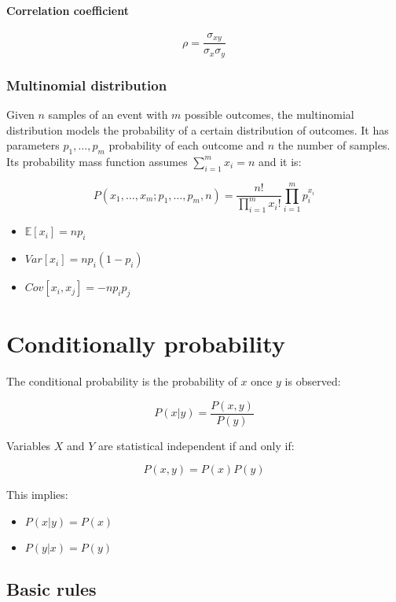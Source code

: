 			\paragraph{Correlation coefficient}

			$$\rho = \frac{\sigma_{xy}}{\sigma_x\sigma_y}$$

		\subsubsection{Multinomial distribution}
		Given $n$ samples of an event with $m$ possible outcomes, the multinomial distribution models the probability of a certain distribution of outcomes.
		It has parameters $p_1,\dots, p_m$ probability of each outcome and $n$ the number of samples.
		Its probability mass function assumes $\sum\limits_{i=1}^mx_i = n$ and it is:

		$$P(x_1, \dots, x_m; p_1, \dots, p_m, n) = \dfrac{n!}{\prod\limits_{i=1}^mx_i!}\prod\limits_{i=1}^mp_i^{x_i}$$

		\begin{multicols}{3}
			\begin{itemize}
				\item $\mathbb{E}[x_i] = np_i$
				\item $Var[x_i] = np_i(1-p_i)$
				\item $Cov[x_i, x_j] = -np_ip_j$
			\end{itemize}
		\end{multicols}


\section{Conditionally probability}
The conditional probability is the probability of $x$ once $y$ is observed:

$$P(x|y) = \dfrac{P(x,y)}{P(y)}$$

Variables $X$ and $Y$ are statistical independent if and only if:

$$P(x,y) = P(x)P(y)$$

This implies:

\begin{multicols}{2}
	\begin{itemize}
		\item $P(x|y) = P(x)$
		\item $P(y|x) = P(y)$
	\end{itemize}
\end{multicols}

	\subsection{Basic rules}

